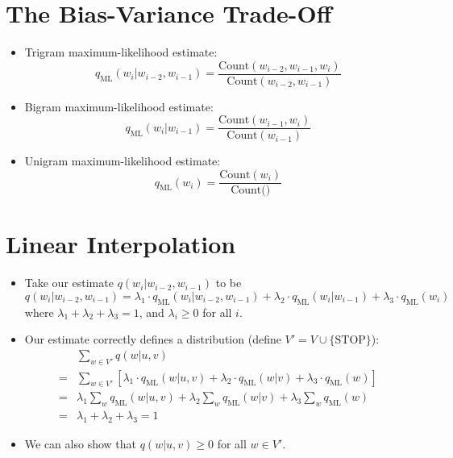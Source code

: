 \documentclass{book}
\begin{document}
\section{The Bias-Variance Trade-Off}
 
    \begin{itemize}
        \item Trigram maximum-likelihood estimate:
        \[
        q_{\text{ML}}(w_i | w_{i-2}, w_{i-1}) = \frac{{\text{Count}(w_{i-2}, w_{i-1}, w_i)}}{{\text{Count}(w_{i-2}, w_{i-1})}}
        \]
        \item Bigram maximum-likelihood estimate:
        \[
        q_{\text{ML}}(w_i | w_{i-1}) = \frac{{\text{Count}(w_{i-1}, w_i)}}{{\text{Count}(w_{i-1})}}
        \]
        \item Unigram maximum-likelihood estimate:
        \[
        q_{\text{ML}}(w_i) = \frac{{\text{Count}(w_i)}}{{\text{Count()}}}
        \]
    \end{itemize}


\section{Linear Interpolation}
    \begin{itemize}
     \item Take our estimate $q(w_i | w_{i-2}, w_{i-1})$ to be
    \[
    q(w_i | w_{i-2}, w_{i-1}) = \lambda_1 \cdot q_{\text{ML}}(w_i | w_{i-2}, w_{i-1}) + \lambda_2 \cdot q_{\text{ML}}(w_i | w_{i-1}) + \lambda_3 \cdot q_{\text{ML}}(w_i)
    \]
    where $\lambda_1 + \lambda_2 + \lambda_3 = 1$, and $\lambda_i \geq 0$ for all $i$.
    
    \item Our estimate correctly defines a distribution (define $V' = V \cup \{\text{STOP}\}$):
    \[
    \begin{aligned}
        & \sum_{w \in V'} q(w | u, v) \\
        = & \sum_{w \in V'} [\lambda_1 \cdot q_{\text{ML}}(w | u, v) + \lambda_2 \cdot q_{\text{ML}}(w | v) + \lambda_3 \cdot q_{\text{ML}}(w)] \\
        = & \lambda_1 \sum_{w} q_{\text{ML}}(w | u, v) + \lambda_2 \sum_{w} q_{\text{ML}}(w | v) + \lambda_3 \sum_{w} q_{\text{ML}}(w) \\
        = & \lambda_1 + \lambda_2 + \lambda_3 = 1
    \end{aligned}
    \]
    \item We can also show that $q(w | u, v) \geq 0$ for all $w \in V'$.
    \end{itemize}    
\end{document}

